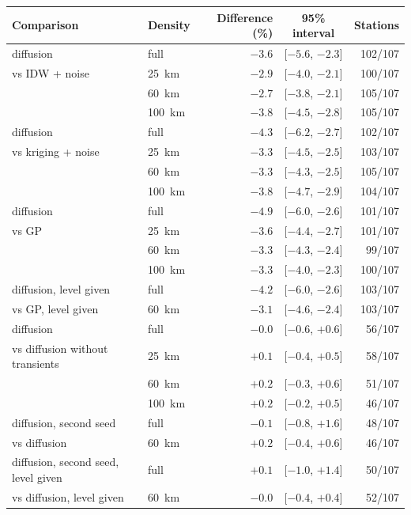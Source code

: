 \begin{tabular}{llrcr}
\toprule
Comparison & Density & Difference (\%) & 95\% interval & Stations \\
\midrule
diffusion & full & $-3.6$ & [$-5.6$, $-2.3$] & 102/107 \\
vs IDW + noise & 25~km & $-2.9$ & [$-4.0$, $-2.1$] & 100/107 \\
 & 60~km & $-2.7$ & [$-3.8$, $-2.1$] & 105/107 \\
 & 100~km & $-3.8$ & [$-4.5$, $-2.8$] & 105/107 \\
\addlinespace
diffusion & full & $-4.3$ & [$-6.2$, $-2.7$] & 102/107 \\
vs kriging + noise & 25~km & $-3.3$ & [$-4.5$, $-2.5$] & 103/107 \\
 & 60~km & $-3.3$ & [$-4.3$, $-2.5$] & 105/107 \\
 & 100~km & $-3.8$ & [$-4.7$, $-2.9$] & 104/107 \\
\addlinespace
diffusion & full & $-4.9$ & [$-6.0$, $-2.6$] & 101/107 \\
vs GP & 25~km & $-3.6$ & [$-4.4$, $-2.7$] & 101/107 \\
 & 60~km & $-3.3$ & [$-4.3$, $-2.4$] & 99/107 \\
 & 100~km & $-3.3$ & [$-4.0$, $-2.3$] & 100/107 \\
\addlinespace
diffusion, level given & full & $-4.2$ & [$-6.0$, $-2.6$] & 103/107 \\
vs GP, level given & 60~km & $-3.1$ & [$-4.6$, $-2.4$] & 103/107 \\
\addlinespace
diffusion & full & $-0.0$ & [$-0.6$, $+0.6$] & 56/107 \\
vs diffusion without transients & 25~km & $+0.1$ & [$-0.4$, $+0.5$] & 58/107 \\
 & 60~km & $+0.2$ & [$-0.3$, $+0.6$] & 51/107 \\
 & 100~km & $+0.2$ & [$-0.2$, $+0.5$] & 46/107 \\
\addlinespace
diffusion, second seed & full & $-0.1$ & [$-0.8$, $+1.6$] & 48/107 \\
vs diffusion & 60~km & $+0.2$ & [$-0.4$, $+0.6$] & 46/107 \\
\addlinespace
diffusion, second seed, level given & full & $+0.1$ & [$-1.0$, $+1.4$] & 50/107 \\
vs diffusion, level given & 60~km & $-0.0$ & [$-0.4$, $+0.4$] & 52/107 \\
\bottomrule
\end{tabular}
